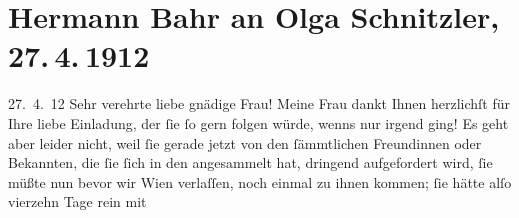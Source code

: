 

         
         \renewcommand{\erwaehntePersonen}{Personen: Anna Bahr-Mildenburg, Olga Schnitzler}
         \renewcommand{\erwaehnteInstitutionen}{Institutionen: Staatsoper}
         \renewcommand{\erwaehnteOrte}{Orte: Wien}
         \renewcommand{\erwaehnteWerke}{}
               \section[Hermann Bahr an Olga Schnitzler, 27. 4. 1912]{ Hermann Bahr an Olga Schnitzler, 27. 4. 1912}\nopagebreak{}\rehead{ }\begin{ledgroupsized}[t]{13cm}\normalsize\beginnumbering \toendnotes[C]{\smallbreak\pagebreak[2]} 
\toendnotes[C]{\smallbreak}\pstart
           \raggedleft{}{\pb}27. 4. 12\pend
           \pstart\center{}Sehr verehrte liebe gnädige Frau!\pend\pstart
           Meine Frau dankt Ihnen
                    herzlichſt für Ihre liebe Einladung, der ſie ſo gern folgen würde, wenns nur
                    irgend ging! Es geht aber leider nicht, weil ſie gerade jetzt von den
                    ſämmtlichen Freundinnen oder Bekannten, die ſie ſich in den \label{K_L02060_1v}\label{K_L02060_1h} angesammelt hat, dringend
                    aufgefordert wird, ſie müßte nun bevor wir Wien
                    verlaſſen, noch einmal zu ihnen kommen; ſie hätte alſo vierzehn Tage rein mit

\end{ledgroupsized}
